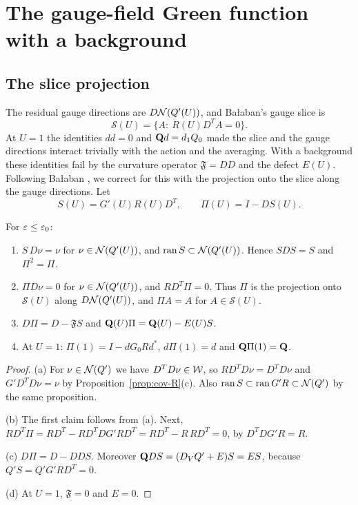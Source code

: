 \section{The gauge-field Green function with a background}\label{sec:cov-gauge}

\subsection{The slice projection}

The residual gauge directions are $D\mathcal N(Q'(U))$, and Ba\l aban's gauge slice is
\[
\mathcal S(U)=\{A:\ R(U)D^TA=0\}.
\]
At $U=1$ the identities $dd=0$ and $\mathbf Q d=d_1 Q_0$ made the slice and the gauge directions interact trivially with the action and the averaging. With a background these identities fail by the curvature operator $\mathfrak F=DD$ and the defect $E(U)$. Following Ba\l aban \cite[(3.118)--(3.119)]{BalBackground}, we correct for this with the projection onto the slice along the gauge directions. Let
\[
S(U)=G'(U)R(U)D^T,\qquad \Pi(U)=I-DS(U).
\]

\begin{lemma}\label{lem:slice}
For $\varepsilon\le\varepsilon_0$:
\begin{enumerate}[label=(\alph*)]
\item $S\,D\nu=\nu$ for $\nu\in\mathcal N(Q'(U))$, and $\operatorname{ran} S\subset\mathcal N(Q'(U))$. Hence $SDS=S$ and $\Pi^2=\Pi$.
\item $\Pi D\nu=0$ for $\nu\in\mathcal N(Q'(U))$, and $RD^T\Pi=0$. Thus $\Pi$ is the projection onto $\mathcal S(U)$ along $D\mathcal N(Q'(U))$, and $\Pi A=A$ for $A\in\mathcal S(U)$.
\item $D\Pi=D-\mathfrak FS$ and $\mathbf Q(U)\Pi=\mathbf Q(U)-E(U)S$.
\item At $U=1$: $\Pi(1)=I-dG_0Rd^*$, $d\Pi(1)=d$ and $\mathbf Q\Pi(1)=\mathbf Q$.
\end{enumerate}
\end{lemma}

\begin{proof}
(a) For $\nu\in\mathcal N(Q')$ we have $D^TD\nu\in\mathcal W$, so $RD^TD\nu=D^TD\nu$ and $G'D^TD\nu=\nu$ by Proposition~\ref{prop:cov-R}(c). Also $\operatorname{ran} S\subset\operatorname{ran} G'R\subset\mathcal N(Q')$ by the same proposition.

(b) The first claim follows from (a). Next, $RD^T\Pi=RD^T-RD^TDG'RD^T=RD^T-R\,RD^T=0$, by $D^TDG'R=R$.

(c) $D\Pi=D-DDS$. Moreover $\mathbf Q DS=(D_VQ'+E)S=ES$, because $Q'S=Q'G'RD^T=0$.

(d) At $U=1$, $\mathfrak F=0$ and $E=0$.
\end{proof}

